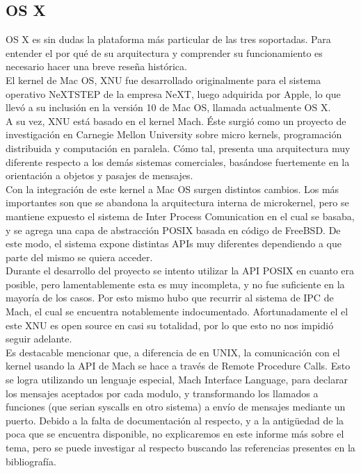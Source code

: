 \subsection{OS X}

OS X es sin dudas la plataforma más particular de las tres soportadas. Para
entender el por qué de su arquitectura y comprender su funcionamiento es
necesario hacer una breve reseña histórica.\\

El kernel de Mac OS, XNU fue desarrollado originalmente para el sistema
operativo NeXTSTEP de la empresa NeXT, luego adquirida por Apple, lo que llevó
a su inclusión en la versión 10 de Mac OS, llamada actualmente OS X.\\

A su vez, XNU está basado en el kernel Mach. Éste surgió como un proyecto de
investigación en Carnegie Mellon University sobre micro kernels, programación
distribuida y computación en paralela. Cómo tal, presenta una arquitectura muy
diferente respecto a los demás sistemas comerciales, basándose fuertemente en la
orientación a objetos y pasajes de mensajes.\\

Con la integración de este kernel a Mac OS surgen distintos cambios. Los más
importantes son que se abandona la arquitectura interna de microkernel, pero se
mantiene expuesto el sistema de Inter Process Comunication en el cual se
basaba, y se agrega una capa de abstracción POSIX basada en código de FreeBSD.
De este modo, el sistema expone distintas APIs muy diferentes dependiendo a que
parte del mismo se quiera acceder.\\

Durante el desarrollo del proyecto se intento utilizar la API POSIX en cuanto
era posible, pero lamentablemente esta es muy incompleta, y no fue suficiente
en la mayoría de los casos. Por esto mismo hubo que recurrir al sistema de IPC
de Mach, el cual se encuentra notablemente indocumentado. Afortunadamente el el
este XNU es open source en casi su totalidad, por lo que esto no nos impidió
seguir adelante.\\

Es destacable mencionar que, a diferencia de en UNIX, la comunicación con el
kernel usando la API de Mach se hace a través de Remote Procedure Calls. Esto
se logra utilizando un lenguaje especial, Mach Interface Language, para
declarar los mensajes aceptados por cada modulo, y transformando los llamados a
funciones (que serian syscalls en otro sistema) a envío de mensajes mediante un
puerto.  Debido a la falta de documentación al respecto, y a la antigüedad de
la poca que se encuentra disponible, no explicaremos en este informe más sobre
el tema, pero se puede investigar al respecto buscando las referencias
presentes en la bibliografía.\\

